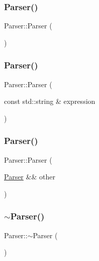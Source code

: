 \subsubsection{\texorpdfstring{Parser()}{Parser()}\hspace{0.1cm}{\footnotesize\ttfamily [1/3]}}
{\footnotesize\ttfamily Parser\+::\+Parser (\begin{DoxyParamCaption}{ }\end{DoxyParamCaption})}

\mbox{\label{class_parser_af4b479fd24e72f6dcd096f6e7531f2c5}} 
\subsubsection{\texorpdfstring{Parser()}{Parser()}\hspace{0.1cm}{\footnotesize\ttfamily [2/3]}}
{\footnotesize\ttfamily Parser\+::\+Parser (\begin{DoxyParamCaption}\item[{const std\+::string \&}]{expression }\end{DoxyParamCaption})}

\mbox{\label{class_parser_aaf729e2242d0c651412faea209cb879f}} 
\subsubsection{\texorpdfstring{Parser()}{Parser()}\hspace{0.1cm}{\footnotesize\ttfamily [3/3]}}
{\footnotesize\ttfamily Parser\+::\+Parser (\begin{DoxyParamCaption}\item[{\mbox{\hyperlink{class_parser}{Parser}} \&\&}]{other }\end{DoxyParamCaption})\hspace{0.3cm}{\ttfamily [default]}}

\mbox{\label{class_parser_a3e658b5917a93a3ef648050d060e3a93}} 
\subsubsection{\texorpdfstring{$\sim$Parser()}{~Parser()}}
{\footnotesize\ttfamily Parser\+::$\sim$\+Parser (\begin{DoxyParamCaption}{ }\end{DoxyParamCaption})}



